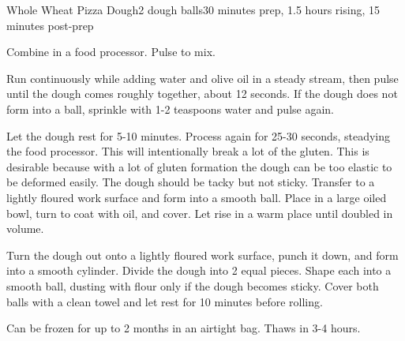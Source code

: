 \documentclass[../Cookbook.tex]{subfiles}
\begin{document}
\begin{recipe}[PizzaDough]{Whole Wheat Pizza Dough}{2 dough balls}{30 minutes prep, 1.5 hours rising, 15 minutes post-prep}

Combine in a food processor. Pulse to mix.

Run continuously while adding water and olive oil in a steady stream, then pulse until the dough comes roughly together, about 12 seconds. If the dough does not form into a ball, sprinkle with 1-2 teaspoons water and pulse again.

\newstep
Let the dough rest for 5-10 minutes. Process again for 25-30 seconds, steadying the food processor. 
This will intentionally break a lot of the gluten. This is desirable because with a lot of gluten formation the dough can be too elastic to be deformed easily.
The dough should be tacky but not sticky. Transfer to a lightly floured work surface and form into a smooth ball.
Place in a large oiled bowl, turn to coat with oil, and cover.
Let rise in a warm place until doubled in volume.

\newstep
Turn the dough out onto a lightly floured work surface, punch it down, and form into a smooth cylinder. Divide the dough into 2 equal pieces. Shape each into a smooth ball, dusting with flour only if the dough becomes sticky. Cover both balls with a clean towel and let rest for 10 minutes before rolling.



Can be frozen for up to 2 months in an airtight bag. Thaws in 3-4 hours.

\end{recipe}
\end{document}
